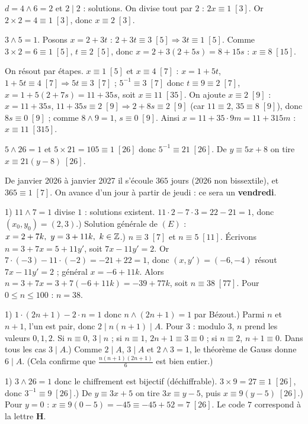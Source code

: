 $d=4\wedge6=2$ et $2\mid2$ : solutions. On divise tout par $2$ : $2x\equiv1\;[3]$. Or
$2\times2=4\equiv1\;[3]$, donc $x\equiv2\;[3]$.

$3\wedge5=1$. Posons $x=2+3t$ : $2+3t\equiv3\;[5]\Rightarrow3t\equiv1\;[5]$. Comme
$3\times2=6\equiv1\;[5]$, $t\equiv2\;[5]$, donc $x=2+3(2+5s)=8+15s$ : $x\equiv8\;[15]$.

On résout par étapes. $x\equiv1\;[5]$ et $x\equiv4\;[7]$ : $x=1+5t$,
$1+5t\equiv4\;[7]\Rightarrow5t\equiv3\;[7]$ ; $5^{-1}\equiv3\;[7]$ donc
$t\equiv9\equiv2\;[7]$, $x=1+5(2+7s)=11+35s$, soit $x\equiv11\;[35]$. On ajoute
$x\equiv2\;[9]$ : $x=11+35s$, $11+35s\equiv2\;[9]\Rightarrow 2+8s\equiv2\;[9]$ (car
$11\equiv2$, $35\equiv8\;[9]$), donc $8s\equiv0\;[9]$ ; comme $8\wedge9=1$, $s\equiv0\;[9]$.
Ainsi $x=11+35\cdot9m=11+315m$ : $x\equiv11\;[315]$.

$5\wedge26=1$ et $5\times21=105\equiv1\;[26]$ donc $5^{-1}\equiv21\;[26]$. De
$y\equiv5x+8$ on tire $x\equiv21(y-8)\;[26]$.

De janvier 2026 à janvier 2027 il s'écoule $365$ jours (2026 non bissextile), et
$365\equiv1\;[7]$. On avance d'un jour à partir de jeudi : ce sera un \textbf{vendredi}.

1) $11\wedge7=1$ divise $1$ : solutions existent. $11\cdot2-7\cdot3=22-21=1$, donc
$(x_0,y_0)=(2,3)$.) Solution générale de $(E)$ : $x=2+7k,\ y=3+11k,\ k\in\mathbb{Z}$.) $n\equiv3\;[7]$ et $n\equiv5\;[11]$. Écrivons $n=3+7x=5+11y'$, soit $7x-11y'=2$. Or
$7\cdot(-3)-11\cdot(-2)=-21+22=1$, donc $(x,y')=(-6,-4)$ résout $7x-11y'=2$ ; général
$x=-6+11k$. Alors $n=3+7x=3+7(-6+11k)=-39+77k$, soit $n\equiv38\;[77]$. Pour $0\le n\le100$ :
$n=38$.

1) $1\cdot(2n+1)-2\cdot n=1$ donc $n\wedge(2n+1)=1$ par Bézout.) Parmi $n$ et $n+1$, l'un est pair, donc $2\mid n(n+1)\mid A$. Pour $3$ : modulo $3$,
$n$ prend les valeurs $0,1,2$. Si $n\equiv0$, $3\mid n$ ; si $n\equiv1$, $2n+1\equiv3\equiv0$ ;
si $n\equiv2$, $n+1\equiv0$. Dans tous les cas $3\mid A$.) Comme $2\mid A$, $3\mid A$ et $2\wedge3=1$, le théorème de Gauss donne $6\mid A$. (Cela
confirme que $\frac{n(n+1)(2n+1)}{6}$ est bien entier.)

1) $3\wedge26=1$ donc le chiffrement est bijectif (déchiffrable). $3\times9=27\equiv1\;[26]$,
donc $3^{-1}\equiv9\;[26]$.) De $y\equiv3x+5$ on tire $3x\equiv y-5$, puis $x\equiv9(y-5)\;[26]$.) Pour $y=0$ : $x\equiv9(0-5)=-45\equiv-45+52=7\;[26]$. Le code $7$ correspond à la lettre
\textbf{H}.
